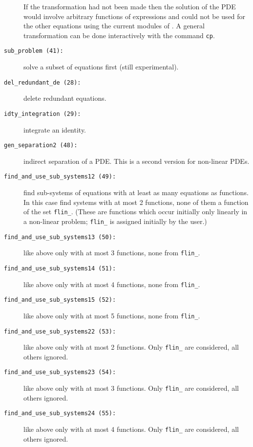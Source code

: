 \begin{description}
  If the transformation had not been made then the solution of the PDE
  would involve arbitrary functions of expressions and could not be
  used for the other equations using the current modules of
  .  A general transformation can be done interactively
  with the command \texttt{cp}.
\item[\texttt{sub\_problem \hypertarget{crack-m_41}{(41)}:}] solve a
  subset of equations first (still experimental).
\item[\texttt{del\_redundant\_de \hypertarget{crack-m_28}{(28)}:}]
  delete redundant equations.
\item[\texttt{idty\_integration \hypertarget{crack-m_29}{(29)}:}]
  integrate an identity.
\item[\texttt{gen\_separation2 \hypertarget{crack-m_48}{(48)}:}]
  indirect separation of a PDE.  This is a second version for
  non-linear PDEs.
\item[\texttt{find\_and\_use\_sub\_systems12
    \hypertarget{crack-m_49}{(49)}:}] find sub-systems of equations
  with at least as many equations as functions.  In this case find
  systems with at most 2 functions, none of them a function of the set
  \texttt{flin\_}.  (These are functions which occur initially only
  linearly in a non-linear problem; \texttt{flin\_} is assigned
  initially by the user.)
\item[\texttt{find\_and\_use\_sub\_systems13
    \hypertarget{crack-m_50}{(50)}:}] like above only with at most 3
  functions, none from \texttt{flin\_}.
\item[\texttt{find\_and\_use\_sub\_systems14
    \hypertarget{crack-m_51}{(51)}:}] like above only with at most 4
  functions, none from \texttt{flin\_}.
\item[\texttt{find\_and\_use\_sub\_systems15
    \hypertarget{crack-m_52}{(52)}:}] like above only with at most 5
  functions, none from \texttt{flin\_}.
\item[\texttt{find\_and\_use\_sub\_systems22
    \hypertarget{crack-m_53}{(53)}:}] like above only with at most 2
  functions.  Only \texttt{flin\_} are considered, all others ignored.
\item[\texttt{find\_and\_use\_sub\_systems23
    \hypertarget{crack-m_54}{(54)}:}] like above only with at most 3
  functions.  Only \texttt{flin\_} are considered, all others ignored.
\item[\texttt{find\_and\_use\_sub\_systems24
    \hypertarget{crack-m_55}{(55)}:}] like above only with at most 4
  functions.  Only \texttt{flin\_} are considered, all others ignored.

\end{description}
